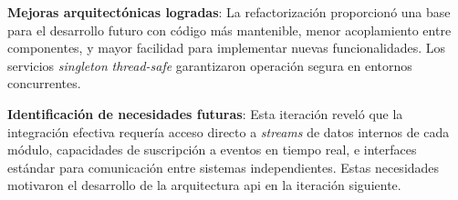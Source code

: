 \textbf{Mejoras arquitectónicas logradas}:
La refactorización proporcionó una base para el desarrollo futuro con código más mantenible, menor acoplamiento entre componentes, y mayor facilidad para implementar nuevas funcionalidades. Los servicios \textit{singleton} \textit{\gls{thread-safe}} garantizaron operación segura en entornos concurrentes.

\textbf{Identificación de necesidades futuras}:
Esta iteración reveló que la integración efectiva requería acceso directo a \textit{\glspl{stream}} de datos internos de cada módulo, capacidades de suscripción a eventos en tiempo real, e interfaces estándar para comunicación entre sistemas independientes. Estas necesidades motivaron el desarrollo de la arquitectura \acrshort{api} en la iteración siguiente.
